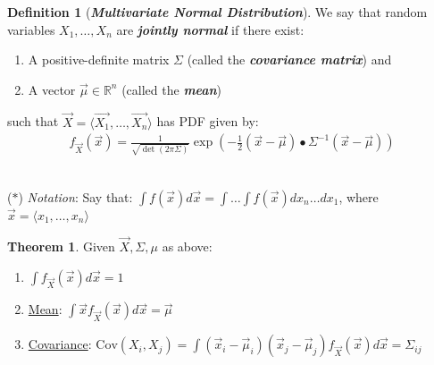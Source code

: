 \documentclass[12pt]{extarticle}
\newcommand{\pstart}[0]{\noindent}
\newcommand{\newp}[0]{~\\\pstart}
\newcommand{\term}[1]{\textbf{\textit{#1}}}
\theoremstyle{definition}
\newtheorem*{definition}{Definition}
\newtheorem*{theorem}{Theorem}
\theoremstyle{remark}
\newcommand{\covariance}[2]{\text{Cov}\left(#1,#2\right)}
\begin{document}
\begin{tcolorbox}[colback=purple!40!pink!20!white]
    \begin{definition}[\term{Multivariate Normal Distribution}]
        We say that random variables $X_1,\hdots,X_n$ are \term{jointly 
normal} if there exist: \begin{enumerate}
            \item A positive-definite matrix $\Sigma$ (called the 
\term{covariance matrix}) and
            \item A vector $\Vec{\mu}\in\mathbb{R}^n$ (called the 
\term{mean})
        \end{enumerate} such that 
$\Vec{X}=\langle\Vec{X_1},\hdots,\Vec{X_n}\rangle$ has PDF given by: 
\begin{align*}            
f_{\Vec{X}}(\Vec{x})=\frac{1}{\sqrt{\det(2\pi\Sigma)}}\exp\left(-\frac{1}{2}(\Vec{x}-\Vec{\mu})\bullet\Sigma^{-1}(\Vec{x}-\Vec{\mu})\right)
        \end{align*}
    \end{definition}
\end{tcolorbox}

\newp
($\ast$) \textit{Notation}: Say that: $\int 
f(\Vec{x})d\Vec{x}=\int\hdots\int f(\Vec{x})dx_n\hdots dx_1$, where 
$\Vec{x}=\langle x_1,\hdots,x_n\rangle$

\begin{theorem}
    Given $\Vec{X},\Sigma,\mu$ as above: \begin{enumerate}
        \item $\int f_{\Vec{X}}(\Vec{x})d\Vec{x}=1$
        \item \ul{Mean}: $\int 
\Vec{x}f_{\Vec{X}}(\Vec{x})d\Vec{x}=\Vec{\mu}$
        \item \ul{Covariance}: 
$\covariance{X_i}{X_j}=\int(\Vec{x}_i-\Vec{\mu}_i)(\Vec{x}_j-\Vec{\mu}_j)f_{\Vec{X}}(\Vec{x})d\Vec{x}=\Sigma_{ij}$
    \end{enumerate}
\end{theorem}
\end{document}

